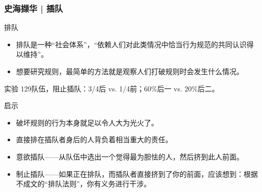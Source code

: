 \begin{frame}
  \frametitle{史海撷华 | 插队}
  \vspace{-0.7em}
  \begin{block}{排队}
    \begin{itemize}
      \item 排队是一种“社会体系”，“依赖人们对此类情况中恰当行为规范的共同认识得以维持”。
      \item \alert{想要研究规则，最简单的方法就是观察人们打破规则时会发生什么情况。}
    \end{itemize}
  \end{block}
  \vspace{-0.7em}
  \pause
  \begin{block}{实验}
    129队伍，阻止插队：3/4后 vs. 1/4前；60\%后一 vs. 20\%后二。
  \end{block}
  \vspace{-0.7em}
  \pause
  \begin{block}{启示}
    \begin{itemize}
      \item 破坏规则的行为本身就足以令人大为光火了。
      \item 直接排在插队者身后的人背负着相当重大的责任。
      \item 意欲插队——从队伍中选出一个觉得最为胆怯的人，然后挤到此人前面。
      \item 制止插队——如果正在排队，而插队者直接挤到了你的前面，应该想到：根据不成文的“排队法则”，你有义务进行干涉。
    \end{itemize}
  \end{block}
\end{frame}

